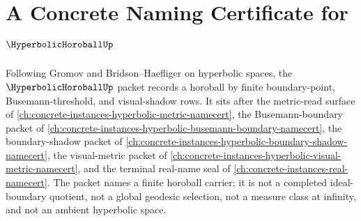 \chapter{A Concrete Naming Certificate for $\HyperbolicHoroballUp$}
\label{ch:concrete-instances-hyperbolic-horoball-namecert}

Following Gromov and Bridson--Haefliger on hyperbolic spaces, the $\HyperbolicHoroballUp$ packet records a horoball by finite boundary-point, Busemann-threshold, and visual-shadow rows. It sits after the metric-read surface of \autoref{ch:concrete-instances-hyperbolic-metric-namecert}, the Busemann-boundary packet of \autoref{ch:concrete-instances-hyperbolic-busemann-boundary-namecert}, the boundary-shadow packet of \autoref{ch:concrete-instances-hyperbolic-boundary-shadow-namecert}, the visual-metric packet of \autoref{ch:concrete-instances-hyperbolic-visual-metric-namecert}, and the terminal real-name seal of \autoref{ch:concrete-instances-real-namecert}. The packet names a finite horoball carrier; it is not a completed ideal-boundary quotient, not a global geodesic selection, not a measure class at infinity, and not an ambient hyperbolic space.

